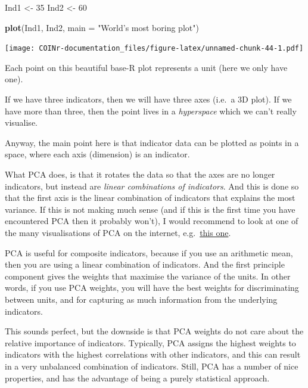 \documentclass[
]{book}
\newenvironment{Shaded}{\begin{snugshade}}{\end{snugshade}}
\newcommand{\DataTypeTok}[1]{\textcolor[rgb]{0.13,0.29,0.53}{#1}}
\newcommand{\DecValTok}[1]{\textcolor[rgb]{0.00,0.00,0.81}{#1}}
\newcommand{\KeywordTok}[1]{\textcolor[rgb]{0.13,0.29,0.53}{\textbf{#1}}}
\newcommand{\NormalTok}[1]{#1}
\newcommand{\StringTok}[1]{\textcolor[rgb]{0.31,0.60,0.02}{#1}}
\begin{document}
\begin{Shaded}
\begin{Highlighting}[]
\NormalTok{Ind1 <-}\StringTok{ }\DecValTok{35}
\NormalTok{Ind2 <-}\StringTok{ }\DecValTok{60}

\KeywordTok{plot}\NormalTok{(Ind1, Ind2, }\DataTypeTok{main =} \StringTok{"World's most boring plot"}\NormalTok{)}
\end{Highlighting}
\end{Shaded}

\texttt{[image: COINr-documentation\_files/figure-latex/unnamed-chunk-44-1.pdf]}

Each point on this beautiful base-R plot represents a unit (here we only have one).

If we have three indicators, then we will have three axes (i.e.~a 3D plot). If we have more than three, then the point lives in a \emph{hyperspace} which we can't really visualise.

Anyway, the main point here is that indicator data can be plotted as points in a space, where each axis (dimension) is an indicator.

What PCA does, is that it rotates the data so that the axes are no longer indicators, but instead are \emph{linear combinations of indicators}. And this is done so that the first axis is the linear combination of indicators that explains the most variance. If this is not making much sense (and if this is the first time you have encountered PCA then it probably won't), I would recommend to look at one of the many visualisations of PCA on the internet, e.g.~\href{https://setosa.io/ev/principal-component-analysis/}{this one}.

PCA is useful for composite indicators, because if you use an arithmetic mean, then you are using a linear combination of indicators. And the first principle component gives the weights that maximise the variance of the units. In other words, if you use PCA weights, you will have the best weights for discriminating between units, and for capturing as much information from the underlying indicators.

This sounds perfect, but the downside is that PCA weights do not care about the relative importance of indicators. Typically, PCA assigns the highest weights to indicators with the highest correlations with other indicators, and this can result in a very unbalanced combination of indicators. Still, PCA has a number of nice properties, and has the advantage of being a purely statistical approach.
\end{document}
